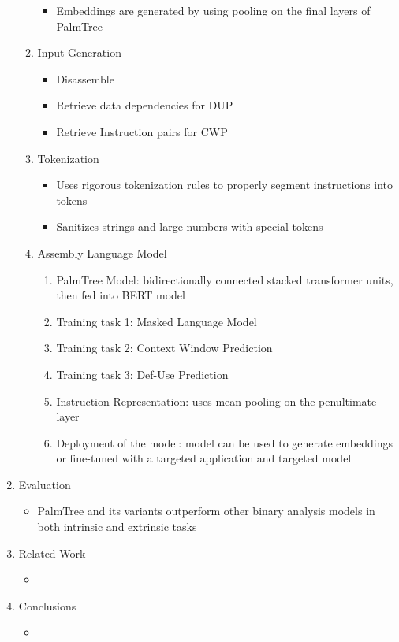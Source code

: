 \documentclass{article}
\begin{document}
\begin{enumerate}
\begin{enumerate}
\begin{itemize}
			\item Embeddings are generated by using pooling on the final layers of PalmTree
		\end{itemize}
	\item Input Generation
	\begin{itemize}
		\item Disassemble
		\item Retrieve data dependencies for DUP 
		\item Retrieve Instruction pairs for CWP
	\end{itemize}
	\item Tokenization
	\begin{itemize}
		\item Uses rigorous tokenization rules to properly segment instructions into tokens
		\item Sanitizes strings and large numbers with special tokens
	\end{itemize}
	\item Assembly Language Model
	\begin{enumerate}
		\item PalmTree Model: bidirectionally connected stacked transformer units, then fed into BERT model
		\item Training task 1: Masked Language Model
		\item Training task 2: Context Window Prediction
		\item Training task 3: Def-Use Prediction
		\item Instruction Representation: uses mean pooling on the penultimate layer
		\item Deployment of the model: model can be used to generate embeddings or fine-tuned with a targeted application and targeted model
	\end{enumerate}
	\end{enumerate}
	\item Evaluation
	\begin{itemize}
		\item PalmTree and its variants outperform other binary analysis models in both intrinsic and extrinsic tasks
	\end{itemize}
	\item Related Work
	\begin{itemize}
		\item 
	\end{itemize}
	\item Conclusions
	\begin{itemize}
		\item 
	\end{itemize}
\end{enumerate}
\end{document}
